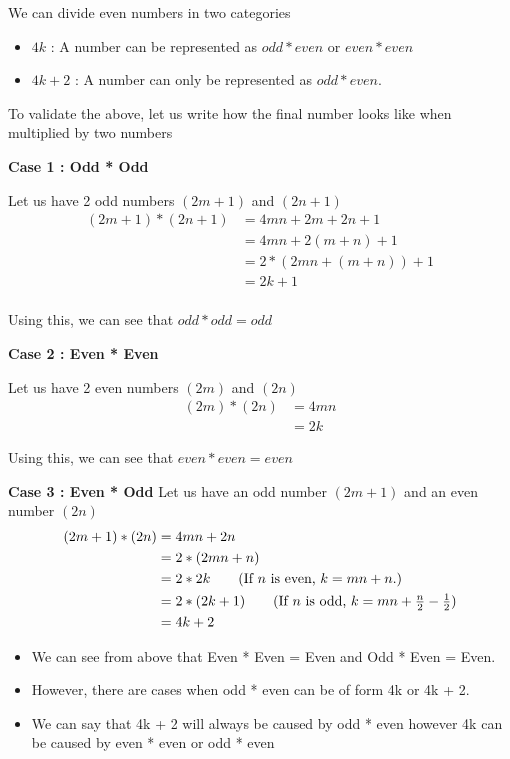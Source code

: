 We can divide even numbers in two categories 
\begin{itemize}
    \item $4k$ : A number can be represented as $odd * even$ or $even * even$
    \item $4k + 2$ : A number can only be represented as $odd * even$. 
\end{itemize}

To validate the above, let us write how the final number looks like when multiplied by two numbers

\textbf{Case 1 : Odd * Odd}

Let us have 2 odd numbers $(2m+1)$ and $(2n+1)$
\begin{align*}
    (2m + 1) * (2n + 1) &= 4mn + 2m + 2n + 1 \\
    &= 4mn + 2(m+n) + 1 \\
    &= 2 * (2mn + (m+n)) + 1 \\
    &= 2k + 1 \tag{$k = (2mn + (m+n))$} \\
\end{align*}

Using this, we can see that $odd * odd = odd$

\textbf{Case 2 : Even * Even}

Let us have 2 even numbers $(2m)$ and $(2n)$
\begin{align*}
    (2m) * (2n) &= 4mn \\
    &= 2k \tag{$k = mn$} 
\end{align*}

Using this, we can see that $even * even = even$

\textbf{Case 3 : Even * Odd}
Let us have an odd number $(2m + 1)$ and an even number $(2n)$
\begin{align*}
    (2m + 1) * (2n) &= 4mn + 2n \\
    &= 2 * (2mn + n) \\
    &= 2 * 2k \tag{If $n$ is even, $k = mn + n$.} \\
    &= 2 * (2k + 1) \tag{If $n$ is odd, $k = mn + \frac{n}{2} - \frac{1}{2}$} \\
    &= 4k + 2
\end{align*}

\begin{itemize}
    \item We can see from above that Even * Even = Even and Odd * Even = Even.
    \item However, there are cases when odd * even can be of form 4k or 4k + 2.
    \item We can say that 4k + 2 will always be caused by odd * even however 4k can be caused by even * even or odd * even 
\end{itemize}

